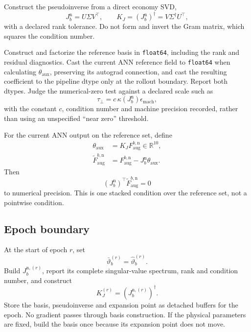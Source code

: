 \documentclass[11pt,a4paper]{article}
\newcommand{\R}{\mathbb R}
\begin{document}
Construct the pseudoinverse from a direct economy SVD,
\begin{equation}
    J_b^{\mathrm n}=U\Sigma V^\top,
    \qquad K_J=(J_b^{\mathrm n})^\dagger=V\Sigma^\dagger U^\top,
    \label{eq:svd}
\end{equation}
with a declared rank tolerance. Do not form and invert the Gram matrix, which
squares the condition number.

Construct and factorize the reference basis in \texttt{float64}, including the
rank and residual diagnostics. Cast the current ANN reference field to
\texttt{float64} when calculating \(\theta_{\mathrm{aux}}\), preserving its
autograd connection, and cast the resulting coefficient to the pipeline dtype
only at the rollout boundary. Report both dtypes. Judge the numerical-zero
test against a declared scale such as
\begin{equation}
    \tau_\perp=c\,\kappa(J_b^{\mathrm n})
    \epsilon_{\mathrm{mach}},
\end{equation}
with the constant \(c\), condition number and machine precision recorded,
rather than using an unspecified ``near zero'' threshold.

For the current ANN output on the reference set, define
\begin{equation}
\begin{aligned}
    \theta_{\mathrm{aux}}
    &=K_JF_{\mathrm{aug}}^{b,\mathrm n}\in\R^{10},\\
    \widetilde F_{\mathrm{aug}}^{b,\mathrm n}
    &=F_{\mathrm{aug}}^{b,\mathrm n}
      -J_b^{\mathrm n}\theta_{\mathrm{aux}}.
\end{aligned}
\label{eq:projection}
\end{equation}
Then
\begin{equation}
    \boxed{(J_b^{\mathrm n})^\top
    \widetilde F_{\mathrm{aug}}^{b,\mathrm n}=0}
    \label{eq:orthogonality}
\end{equation}
to numerical precision. This is one stacked condition over the reference set,
not a pointwise condition.

\subsection{Epoch boundary}

At the start of epoch \(r\), set
\begin{equation}
    \bar\vartheta_b^{(r)}=\widehat\vartheta_b^{(r)}.
\end{equation}
Build \(J_b^{\mathrm n,(r)}\), report its complete singular-value spectrum,
rank and condition number, and construct
\begin{equation}
    K_J^{(r)}=(J_b^{\mathrm n,(r)})^\dagger.
\end{equation}
Store the basis, pseudoinverse and expansion point as detached buffers for the
epoch. No gradient passes through basis construction. If the physical
parameters are fixed, build the basis once because its expansion point does
not move.
\end{document}
